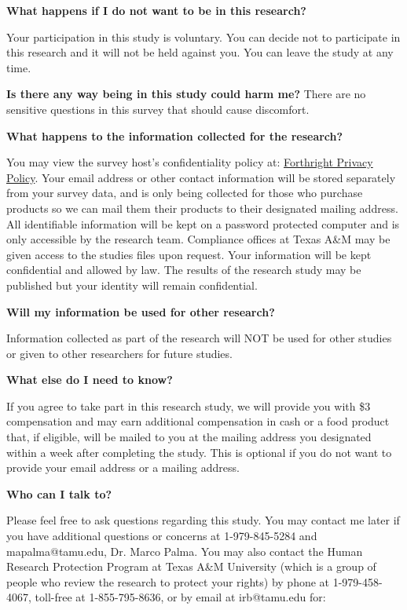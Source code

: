 \documentclass[12pt]{article}
\begin{document}
\textbf{
What happens if I do not want to be in this research?} \par
Your participation in this study is voluntary. You can decide not to participate in this research and it will not be held against you. You can leave the study at any time. \par

\textbf{Is there any way being in this study could harm me?}
There are no sensitive questions in this survey that should cause discomfort. \par

\textbf{What happens to the information collected for the research?} \par
You may view the survey host’s confidentiality policy at: \href{https://www.beforthright.com/privacy}{Forthright Privacy Policy}. Your email address or other contact information will be stored separately from your survey data, and is only being collected for those who purchase products so we can mail them their products to their designated mailing address. All identifiable information will be kept on a password protected computer and is only accessible by the research team. Compliance offices at Texas A\&M may be given access to the studies files upon request. Your information will be kept confidential and allowed by law. The results of the research study may be published but your identity will remain confidential. \par

\textbf{Will my information be used for other research?} \par
Information collected as part of the research will NOT be used for other studies or given to other researchers for future studies. \par

\textbf{What else do I need to know?} \par

If you agree to take part in this research study, we will provide you with  \$3 compensation and may earn additional compensation in cash or a food product that, if eligible, will be mailed to you at the mailing address you designated within a week after completing the study. This is optional if you do not want to provide your email address or a mailing address. \par

\textbf{Who can I talk to?} \par

Please feel free to ask questions regarding this study. You may contact me later if you have additional questions or concerns at 1-979-845-5284 and mapalma@tamu.edu, Dr. Marco Palma. You may also contact the Human Research Protection Program at Texas A\&M University (which is a group of people who review the research to protect your rights) by phone at 1-979-458-4067, toll-free at 1-855-795-8636, or by email at irb@tamu.edu for:\par
\end{document}

